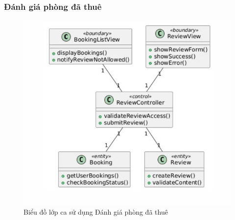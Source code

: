 \subsubsection{Đánh giá phòng đã thuê}
\begin{figure}[H]
    \centering
    \includegraphics[width=\textwidth]{img2.2/nhaxet.jpg}
    \caption{Biểu đồ lớp ca sử dụng Đánh giá phòng đã thuê}
\end{figure}

